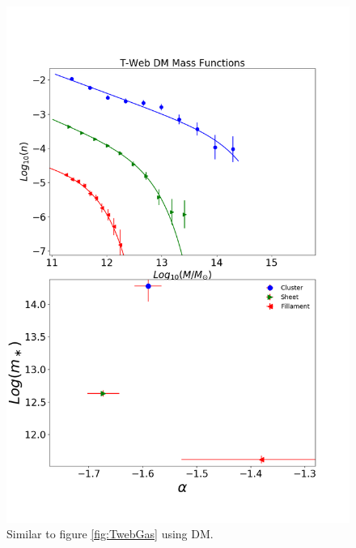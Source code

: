 \documentclass[a4paper,fleqn,usenatbib]{mnras}
\begin{document}
\begin{figure}
	\includegraphics[width=\columnwidth]{./pics/F19_T-Web_DM.png}
    \caption{Similar to figure \ref{fig:TwebGas} using DM.} 
    \label{fig:TwebDM}
\end{figure}
\end{document}
